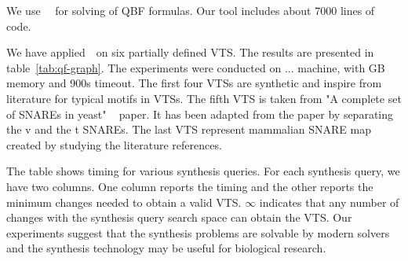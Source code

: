 %
We use~\depqbf~\cite{lonsing2010depqbf} for solving of QBF formulas. 
%
Our tool includes about 7000 lines of code.

We have applied~\ourtool~on six partially defined VTS.
%
The results are presented in table~\ref{tab:qf-graph}.
%
The experiments were conducted on ... machine,
with GB memory and 900s timeout.
%
The first four VTSs are synthetic and inspire from literature for typical
motifs in VTSs. 
%
%
The fifth VTS is taken from "A complete set of SNAREs in yeast"
~\cite{burri2004complete} paper. It has been adapted from the paper by separating the v and the t SNAREs. 
%
The last VTS represent mammalian SNARE map created by studying the literature references.  

The table shows timing for various synthesis queries.
%
For each synthesis query, we have two columns.
%
One column reports the timing and the other reports the minimum changes
needed to obtain a valid VTS.
%
$\infty$ indicates that any number of changes with the synthesis query
search space can obtain the VTS.
%
%
%
Our experiments suggest that the synthesis problems are solvable by modern
solvers and the synthesis technology may be useful for biological research.
%


